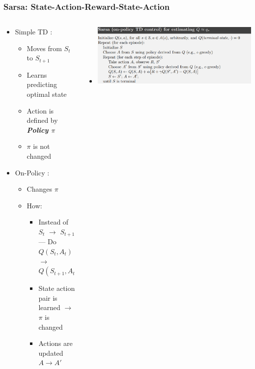 \documentclass{beamer} %
\begin{document}
\begin{frame}
\frametitle{Sarsa: State-Action-Reward-State-Action}
\begin{columns}
    \begin{column}{.6\textwidth}
     	\begin{block}{}
			\begin{itemize}
				
				\item Simple TD : 
				\begin{itemize}
					\item Moves from $S_t$ to $S_{t+1}$
					\item Learns predicting optimal state 
					\item Action is defined by \textbf{\textit{Policy  $\pi$}}
					\item $\pi$ is not changed
				\end{itemize}
				\item On-Policy : 
					\begin{itemize}
						\item Changes $\pi$
						\item How:
						\begin{itemize}
							\item Instead of $S_t$ $\longrightarrow$ $S_{t+1}$ --- Do $Q(S_t, A_t)$ $\longrightarrow$ $Q(S_{t+1}, A_{t+1})$
							\item State action pair is learned $\longrightarrow$  $\pi$ is changed 
							\item Actions are updated $A \longrightarrow A'$ 

						\end{itemize} 
					\end{itemize}
				\end{itemize}
		\end{block}
    \end{column}
    \begin{column}{.4\textwidth}
    \begin{block}{}
		\begin{itemize}
			\item \includegraphics[height=.5\textheight, width=\columnwidth]{sarsa.png}

		\end{itemize}
    \end{block}
    \end{column}
\end{columns}
			
\end{frame}
\end{document}
